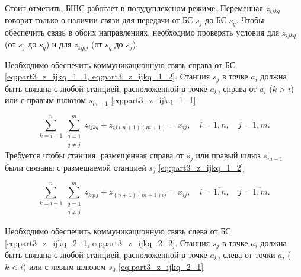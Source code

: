 

Стоит отметить, БШС работает в полудуплексном режиме. Переменная $z_{ijkq}$ говорит только о наличии связи для передачи от БС $s_j$ до БС $s_q$. Чтобы обеспечить связь в обоих направлениях, необходимо проверять условия для  $z_{ijkq}$ (от $s_j$ до $s_q$) и для $z_{kqij}$ (от $s_q$ до $s_j$).

Необходимо обеспечить коммуникационную связь справа от БС \cref{eq:part3_z_ijkq_1_1, eq:part3_z_ijkq_1_2}. Станция $ s_j $ в точке $ a_i $ должна быть связана с  любой станцией, расположенной в точке $ a_k $, справа от $ a_i $ ($ k> i $) или с правым шлюзом $ s_{m + 1} $ \cref{eq:part3_z_ijkq_1_1} 

\begin{equation}
  \label{eq:part3_z_ijkq_1_1}
  \sum\limits_{k=i+1}^{n} \sum\limits_{\substack{q = 1\\ q \neq j}}^m z_{ijkq} + z_{ij(n+1)(m+1)} = x_{ij} ,  \quad i = \overline{1, n}, \quad j = \overline{1, m}.
\end{equation}
Требуется чтобы станция, размещенная справа от $s_j$ или правый шлюз $ s_{m + 1} $  были связаны с размещаемой станцией $ s_j $ \cref{eq:part3_z_ijkq_1_2}

\begin{equation}
  \label{eq:part3_z_ijkq_1_2}
  \sum\limits_{k=i+1}^{n} \sum\limits_{\substack{q = 1\\ q \neq j}}^m z_{kqij} + z_{(n+1)(m+1)ij} = x_{ij} ,  \quad i = \overline{1, n}, \quad j = \overline{1, m}.
\end{equation}

Необходимо обеспечить коммуникационную связь слева от БС \cref{eq:part3_z_ijkq_2_1, eq:part3_z_ijkq_2_2}. Станция $ s_j $ в точке $ a_i $ должна быть связана с  любой станцией, расположенной в точке $ a_k $, слева от точки $ a_i $ ($ k <i $) или с левым шлюзом $ s_{0}$ \cref{eq:part3_z_ijkq_2_1} 

